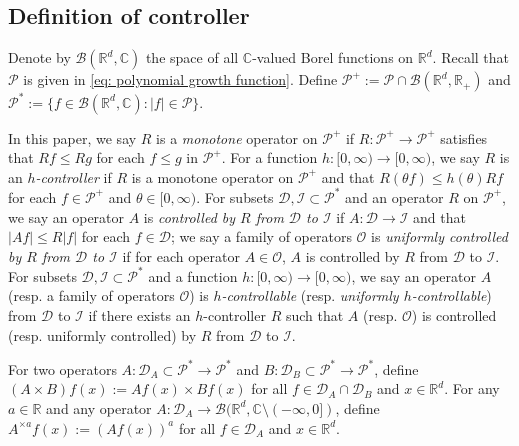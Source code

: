 \documentclass[12pt,a4paper]{amsart}
\theoremstyle{plain}
\theoremstyle{definition}
\numberwithin{equation}{section}
\begin{document}
\subsection{Definition of controller}
\label{sec: controller}
Denote by $\mathcal B(\mathbb R^d, \mathbb C)$ the space of all $\mathbb C$-valued Borel functions on $\mathbb R^d$.
Recall that $\mathcal P$ is given in \eqref{eq: polynomial growth function}.
Define $\mathcal P^+:= \mathcal P \cap \mathcal B(\mathbb R^d, \mathbb R_+)$ and $\mathcal P^*:= \{f\in \mathcal B(\mathbb R^d, \mathbb C): |f|\in \mathcal P\}$.

In this paper, we say $R$ is a \emph{monotone} operator on $\mathcal P^+$ if $R:\mathcal P^+ \to \mathcal P^+$ satisfies that $Rf\leq Rg$ for each $f\leq g$ in $\mathcal P^+$.
For a function $h: [0,\infty) \to [0,\infty)$, we say $R$ is an \emph{$h$-controller} if $R$ is a monotone operator on $\mathcal P^+$ and that $R(\theta f)\leq h(\theta) Rf$ for each $f\in \mathcal P^+$ and $\theta \in [0,\infty)$.
For subsets $\mathcal D, \mathcal I\subset \mathcal P^*$ and an operator $R$ on $\mathcal P^+$, we say an operator $A$ is \emph{controlled by $R$ from $\mathcal D$ to $\mathcal I$} if $A:\mathcal D \to \mathcal I$ and that $|Af| \leq R|f|$ for each $f\in \mathcal D$;
we say a family of operators $\mathscr O$ is \emph{uniformly controlled by $R$ from $\mathcal D$ to $\mathcal I$} if for each operator $A\in \mathscr O$, $A$ is controlled by $R$ from $\mathcal D$ to $\mathcal I$.
For subsets $\mathcal D, \mathcal I\subset \mathcal P^*$ and a function $h:[0,\infty) \to [0,\infty)$, we say an operator $A$ (resp. a family of operators $\mathscr O$) is \emph{$h$-controllable} (resp. \emph{uniformly $h$-controllable}) from $\mathcal D$ to $\mathcal I$ if there exists an $h$-controller $R$ such that $A$ (resp. $\mathscr O$) is controlled (resp. uniformly controlled) by $R$ from $\mathcal D$ to $\mathcal I$.

For two operators $A: \mathcal D_A \subset \mathcal P^*\to \mathcal P^*$ and $B: \mathcal D_B \subset \mathcal P^*\to \mathcal P^*$, define $(A \times B)f (x):= Af(x) \times Bf(x)$ for all $f\in \mathcal D_A \cap \mathcal D_B$ and $x\in \mathbb{R}^d$.
For any $a \in \mathbb R$ and any operator $A :\mathcal D_A \to \mathcal B(\mathbb R^d, \mathbb C\setminus (-\infty, 0])$, define $A^{\times a}f(x):= (Af(x))^a$ for all $f\in \mathcal D_A$ and $x\in \mathbb R^d$.
\end{document}
